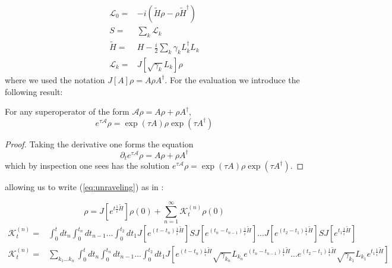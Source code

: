 \begin{align}
\mathcal{L}_{0} =& -i(\tilde{H}\rho - \rho\tilde{H}^{\dagger})\\
S =& \sum_{k}\mathcal{L}_{k}\\
  \tilde{H} =& H - \frac{i}{2}\sum_{k}\gamma_{k}L_{k}^{\dagger}L_{k}\\
  \mathcal{L}_{k} = & J[\sqrt{\gamma_{k}}L_{k}]\rho\
\end{align}
where we used the notation $J[A]\rho = A\rho A^{\dagger}$.
For the evaluation we introduce the following result:
\begin{lemma}
  For any superoperator of the form $\mathcal{A}\rho = A\rho+\rho A^{\dagger}$,
  \begin{equation}
    e^{\tau\mathcal{A}}\rho=\exp(\tau A)\rho\exp(\tau A^{\dagger})
  \end{equation}
\end{lemma}
  \begin{proof}
    Taking the derivative one forms the equation
    \begin{equation}
      \partial_{t}e^{\tau\mathcal{A}}\rho =  A\rho+\rho A^{\dagger}
    \end{equation}
    which by inspection one sees has the solution
    $e^{\tau\mathcal{A}}\rho=\exp(\tau A)\rho\exp(\tau A^{\dagger})$.
  \end{proof}
  allowing us to write (\ref{eq:unraveling}) as in \cite{wiseman_quantum_2010}:

  \begin{equation}
    \rho = J[e^{t \frac{1}{i}\tilde{H}}]\rho(0)  +  \sum_{n=1}^{\infty}\mathcal{K}^{(n)}_{t}\rho(0)
      \end{equation}
\begin{align}
  \mathcal{K}^{(n)}_{t}=&\int_{0}^{t}dt_{n}\int_{0}^{t_{n}}dt_{n-1}...\int_{0}^{t_{2}}dt_{1}J[e^{(t-t_{n}) \frac{1}{i}\tilde{H}}]SJ[e^{(t_{n}-t_{n-1}) \frac{1}{i}\tilde{H}}]...J[e^{(t_{2}-t_{1}) \frac{1}{i}\tilde{H}}]SJ[e^{t_{1}\frac{1}{i}\tilde{H}}]\\
  \mathcal{K}^{(n)}_{t}=&\sum_{k_{1}...k_{n}}\int_{0}^{t}dt_{n}\int_{0}^{t_{n}}dt_{n-1}...\int_{0}^{t_{2}}dt_{1}J\left[e^{(t-t_{n})\frac{1}{i}\tilde{H}}\sqrt{\gamma_{k_{n}}}L_{k_{n}}e^{(t_{n}-t_{n-1})\frac{1}{i}\tilde{H}}...e^{(t_{2}-t_{1})\frac{1}{i}\tilde{H}}\sqrt{\gamma_{k_{1}}}L_{k_{1}}e^{t_{1}\frac{1}{i}\tilde{H}}\right]
\end{align}
